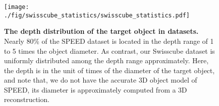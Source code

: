  
 

\begin{figure}[t]
    \begin{center}
    \texttt{[image: ./fig/swisscube\_statistics/swisscube\_statistics.pdf]}
    \end{center}
    \vspace{-6mm}
    \caption{{\bf The depth distribution of the target object in datasets.} 
    Nearly 80\% of the SPEED dataset is located in the depth range of 1 to 5 times the object diameter. As contrast, our Swisscube dataset is uniformly distributed among the depth range approximately. Here, the depth is in the unit of times of the diameter of the target object, and note that, we do not have the accurate 3D object model of SPEED, its diameter is approximately computed from a 3D reconstruction. 
    }
    \label{fig:swisscube_statistics}
\end{figure}
